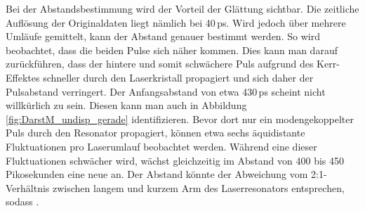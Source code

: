 \documentclass[bachelor,       %
               twoside,        %
               BCOR10mm,       %
               liststotoc,nomtotoc,bibtotoc, %
               english,ngerman, %
               final,          %
               ]{GAUBM}
\begin{document}
Bei der Abstandsbestimmung wird der Vorteil der Glättung sichtbar.
Die zeitliche Auflösung der Originaldaten liegt nämlich bei 40\,ps.
Wird jedoch über mehrere Umläufe gemittelt, kann der Abstand genauer bestimmt werden.
So wird beobachtet, dass die beiden Pulse sich näher kommen.
Dies kann man darauf zurückführen, dass der hintere und somit schwächere Puls aufgrund des Kerr-Effektes schneller durch den Laserkristall propagiert und sich daher der Pulsabstand verringert.
Der Anfangsabstand von etwa 430\,ps scheint nicht willkürlich zu sein.
Diesen kann man auch in Abbildung \ref{fig:DarstM_undisp_gerade} identifizieren.
Bevor dort nur ein modengekoppelter Puls durch den Resonator propagiert, können etwa sechs äquidistante Fluktuationen pro Laserumlauf beobachtet werden.
Während eine dieser Fluktuationen schwächer wird, wächst gleichzeitig im Abstand von 400 bis 450 Pikosekunden eine neue an.
Der Abstand könnte der Abweichung vom 2:1-Verhältnis zwischen langem und kurzem Arm des Laserresonators entsprechen, sodass .
\end{document}
